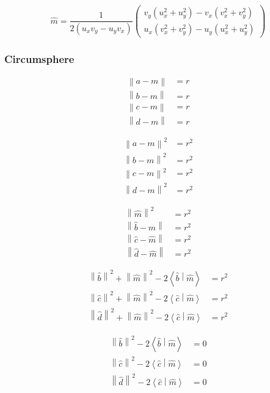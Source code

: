 \documentclass[10pt, twoside, fleqn]{article}
\newcommand{\norm}[1]{\left\| #1 \right\|}
\newcommand{\scalarproduct}[2]{\left\langle #1 \middle| #2 \right\rangle}
\begin{document}
        \[
          \hat{m} =
          \frac{1}{2 (u_x v_y - u_y v_x)}
          \begin{pmatrix}
            v_y (u_x^2 + u_y^2) - v_x (v_x^2 + v_y^2) \\
            u_x (v_x^2 + v_y^2) - u_y (u_x^2 + u_y^2)
          \end{pmatrix}
        \]

      \subsubsection{Circumsphere} %
        \begin{align*}
          \norm{a - m} &= r \\
          \norm{b - m} &= r \\
          \norm{c - m} &= r \\
          \norm{d - m} &= r
        \end{align*}

        \begin{align*}
          \norm{a - m}^2 &= r^2 \\
          \norm{b - m}^2 &= r^2 \\
          \norm{c - m}^2 &= r^2 \\
          \norm{d - m}^2 &= r^2
        \end{align*}

        \begin{align*}
          \norm{\hat{m}}^2 &= r^2 \\
          \norm{\hat{b} - \hat{m}} &= r^2 \\
          \norm{\hat{c} - \hat{m}} &= r^2 \\
          \norm{\hat{d} - \hat{m}} &= r^2
        \end{align*}

        \begin{align*}
          \norm{\hat{b}}^2 + \norm{\hat{m}}^2 - 2 \scalarproduct{\hat{b}}{\hat{m}} &= r^2 \\
          \norm{\hat{c}}^2 + \norm{\hat{m}}^2 - 2 \scalarproduct{\hat{c}}{\hat{m}} &= r^2 \\
          \norm{\hat{d}}^2 + \norm{\hat{m}}^2 - 2 \scalarproduct{\hat{c}}{\hat{m}} &= r^2
        \end{align*}

        \begin{align*}
          \norm{\hat{b}}^2 - 2 \scalarproduct{\hat{b}}{\hat{m}} &= 0 \\
          \norm{\hat{c}}^2 - 2 \scalarproduct{\hat{c}}{\hat{m}} &= 0 \\
          \norm{\hat{d}}^2 - 2 \scalarproduct{\hat{c}}{\hat{m}} &= 0
        \end{align*}
\end{document}
